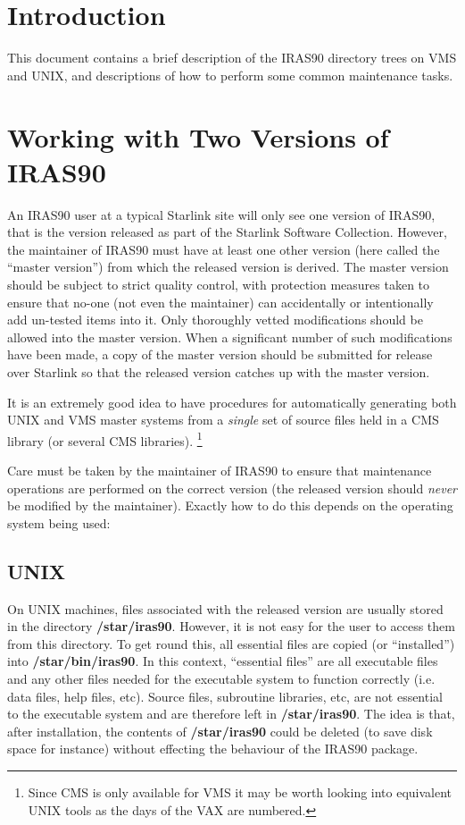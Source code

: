 \setlength{\parskip}{0mm} \tableofcontents
\setlength{\parskip}{\medskipamount} \markright{\stardocname}

\section{Introduction}
This document contains a brief description of the {\small IRAS90} directory
trees on {\small VMS} and {\small UNIX}, and descriptions of how to perform some
common maintenance tasks.

\section{Working with Two Versions of IRAS90}
An {\small IRAS90} user at a typical Starlink site will only see one version of
{\small IRAS90}, that is the version released as part of the Starlink Software
Collection. However, the maintainer of {\small IRAS90} must have at least one
other version (here called the ``master version'') from which the released
version is derived. The master version should be subject to strict quality
control, with protection measures taken to ensure that no-one (not even the
maintainer) can accidentally or intentionally add un-tested items into it. Only
thoroughly vetted modifications should be allowed into the master version. When
a significant number of such modifications have been made, a copy of the master
version should be submitted for release over Starlink so that the released
version catches up with the master version.

It is an extremely good idea to have procedures for automatically generating
both {\small UNIX} and {\small VMS} master systems from a {\em single} set of
source files held in a {\small CMS} library (or several {\small CMS} libraries).
\footnote{Since {\small CMS} is only available for {\small VMS} it may be worth
looking into equivalent {\small UNIX} tools as the days of the {\small VAX} are
numbered.}

Care must be taken by the maintainer of {\small IRAS90} to ensure that
maintenance operations are performed on the correct version (the released
version should {\em never} be modified by the maintainer). Exactly how to do
this depends on the operating system being used:

\subsection{UNIX}
On {\small UNIX} machines, files associated with the released version
are usually stored in the directory {\bf /star/iras90}. However, it is not easy
for the user to access them from this directory. To get round this, all
essential files are copied (or ``installed'') into {\bf /star/bin/iras90}. In
this context, ``essential files'' are all executable files and any other files
needed for the executable system to function correctly (i.e. data files, help
files, etc). Source files, subroutine libraries, etc, are not essential to the
executable system and are therefore left in {\bf /star/iras90}. The idea is
that, after installation, the contents of {\bf /star/iras90} could be deleted
(to save disk space for instance) without effecting the behaviour of the {\small
IRAS90} package.

